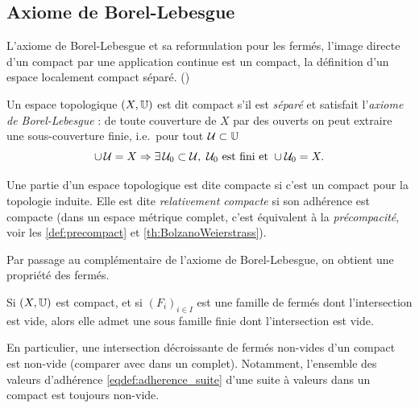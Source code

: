 \subsection{Axiome de Borel-Lebesgue} %
\label{subsec:axiomBorelLeb}


\begin{retenir}
	L'axiome de Borel-Lebesgue et sa reformulation pour les fermés, l'image directe d'un compact par une application continue est un compact, la définition d'un espace localement compact séparé.
	()
\end{retenir}


\begin{definition}[Compact]
\label{def:compact}
%
	Un espace topologique $(X, \mathbb{U})$ est dit compact s'il est \emph{séparé} et satisfait l'\emph{axiome de Borel-Lebesgue} : de toute couverture de $X$ par des ouverts on peut extraire une sous-couverture finie, i.e.\ pour tout $\mathcal{U} \subset \mathbb{U}$
	\begin{equation*}
	\cup\, \mathcal{U}=X \Rightarrow 
	\exists\, \mathcal{U}_0\subset \mathcal{U},\ \mathcal{U}_0 \text{ est fini et } \cup\mathcal{U}_0 = X.
	\end{equation*}
\end{definition}

Une partie d'un espace topologique est dite compacte si c'est un compact pour la topologie induite. Elle est dite \emph{relativement compacte} si son adhérence est compacte (dans un espace métrique complet, c'est équivalent à la \emph{précompacité}, voir les \cref{def:precompact} et \cref{th:BolzanoWeierstrass}).

Par passage au complémentaire de l'axiome de Borel-Lebesgue, on obtient une propriété des fermés. 
\begin{remark}
\label{rem:fermeBorelLeb}
%
Si $(X,\mathbb{U})$ est compact, et si $(F_i)_{i \in I}$ est une famille de fermés dont l'intersection est vide, alors elle admet une sous famille finie dont l'intersection est vide. 	

En particulier, une intersection décroissante de fermés non-vides d'un compact est non-vide (comparer avec  dans un complet). Notamment, l'ensemble des valeurs d'adhérence \eqref{eqdef:adherence_suite} d'une suite à valeurs dans un compact est toujours non-vide.
\end{remark}

